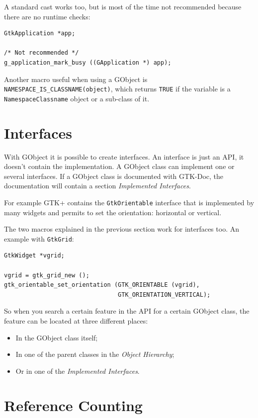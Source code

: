 A standard cast works too, but is most of the time not recommended because there are no runtime checks:
\begin{lstlisting}
GtkApplication *app;

/* Not recommended */
g_application_mark_busy ((GApplication *) app);
\end{lstlisting}

Another macro useful when using a GObject is \lstinline{NAMESPACE_IS_CLASSNAME(object)}, which returns \lstinline{TRUE} if the variable is a \lstinline{NamespaceClassname} object or a sub-class of it.


\section{Interfaces}

With GObject it is possible to create interfaces. An interface is just an API, it doesn't contain the implementation. A GObject class can implement one or several interfaces. If a GObject class is documented with GTK-Doc, the documentation will contain a section \emph{Implemented Interfaces}.

For example GTK+ contains the \lstinline{GtkOrientable} interface that is implemented by many widgets and permits to set the orientation: horizontal or vertical.

The two macros explained in the previous section work for interfaces too. An example with \lstinline{GtkGrid}:
\begin{lstlisting}
GtkWidget *vgrid;

vgrid = gtk_grid_new ();
gtk_orientable_set_orientation (GTK_ORIENTABLE (vgrid),
                                GTK_ORIENTATION_VERTICAL);
\end{lstlisting}

So when you search a certain feature in the API for a certain GObject class, the feature can be located at three different places:
\begin{itemize}
  \item In the GObject class itself;
  \item In one of the parent classes in the \emph{Object Hierarchy};
  \item Or in one of the \emph{Implemented Interfaces}.
\end{itemize}

\section{Reference Counting}


